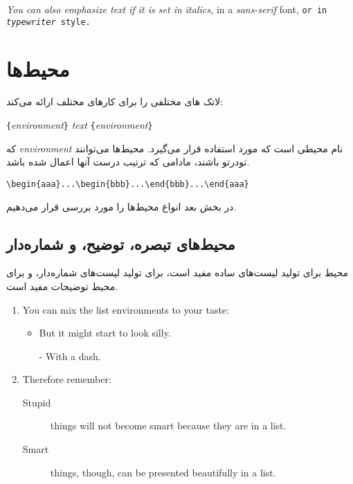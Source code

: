\begin{example}
\textit{You can also
  \emph{emphasize} text if 
  it is set in italics,} 
\textsf{in a 
  \emph{sans-serif} font,}
\texttt{or in 
  \emph{typewriter} style.}
\end{example}

\section{محیط‌ها} \label{env}
لاتک 
های
مختلفی را برای کارهای مختلف ارائه می‌کند:

\begin{lscommand}
\verb|{|\emph{environment}\verb|}|\quad
   \emph{text}\quad
{}\verb|{|\emph{environment}\verb|}|
\end{lscommand}

\noindent 
که 
\emph{environment}
نام محیطی است که مورد استفاده قرار می‌گیرد. محیط‌ها می‌توانند تودرتو باشند، مادامی که ترتیب درست آنها اعمال شده باشد.
\begin{code}
\verb|\begin{aaa}...\begin{bbb}...\end{bbb}...\end{aaa}|
\end{code}

\noindent 
در بخش بعد انواع محیط‌ها را مورد بررسی قرار می‌دهیم.
\subsection{محیط‌های تبصره، توضیح، و شماره‌دار}
محیط 
برای تولید لیست‌های ساده مفید است، 
برای تولید لیست‌های شماره‌دار، و 
برای محیط توضیحات مفید است.

\begin{example}
\flushleft
\begin{enumerate}
\item You can mix the list
environments to your taste:
\begin{itemize}
\item But it might start to
look silly. 
\item[-] With a dash.
\end{itemize}
\item Therefore remember:
\begin{description}
\item[Stupid] things will not
become smart because they are
in a list.
\item[Smart] things, though,
can be presented beautifully
in a list.
\end{description}
\end{enumerate}
\end{example}
